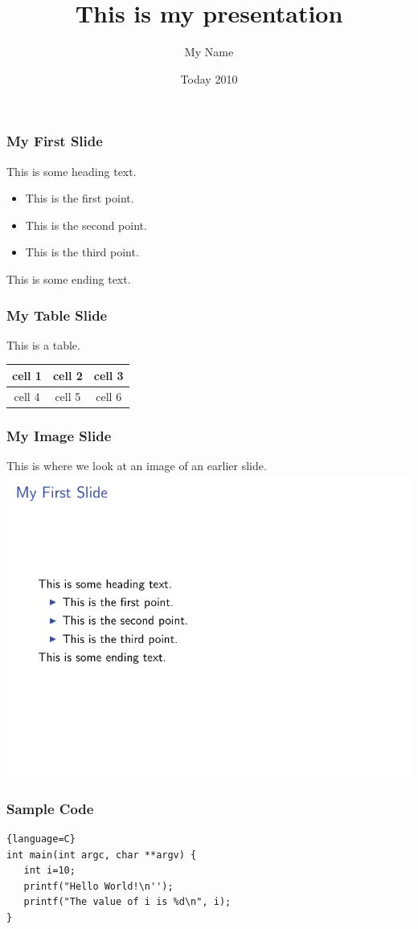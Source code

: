 \documentclass{beamer}
\title{This is my presentation}
\author{My Name}
\date{Today 2010}
\begin{document}
\maketitle

\begin{frame}
   \frametitle{My First Slide}
   This is some heading text.
   \begin{itemize}
      \item This is the first point.
      \item This is the second point.
      \item This is the third point.
   \end{itemize}
   This is some ending text.
\end{frame}

\begin{frame}
   \frametitle{My Table Slide}
   This is a table. \\
   \begin{tabular}{|c|c|c|}
      \hline
      cell 1 & cell 2 & cell 3 \\
      \hline
      cell 4 & cell 5 & cell 6 \\
      \hline
   \end{tabular}
\end{frame}

\begin{frame}
   \frametitle{My Image Slide}
   This is where we look at an image of an earlier slide.
   \includegraphics[angle=180,scale=0.5]{slide1.png}
\end{frame}

\begin{frame}[fragile,shrink=5]
   \frametitle{Sample Code}
   \begin{lstlisting}{language=C}
int main(int argc, char **argv) {
   int i=10;
   printf("Hello World!\n'');
   printf("The value of i is %d\n", i);
}
   \end{lstlisting}
\end{frame}
\end{document}
